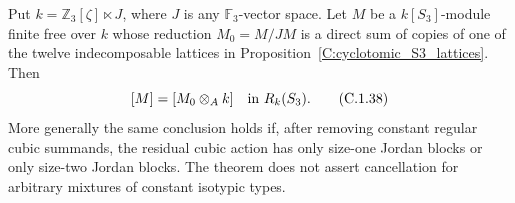 \begin{theorem}
\label{C:S3_isotypic_shallow_cancellation}
Put $k=\mathbb Z_3[\zeta]\ltimes J$, where $J$ is any
$\mathbb F_3$-vector space. Let $M$ be a $k[S_3]$-module finite free over $k$ whose reduction $M_0=M/JM$ is a direct sum
of copies of one of the twelve indecomposable lattices in
Proposition~\ref{C:cyclotomic_S3_lattices}. Then
\[
                         [M]=[M_0\otimes_Ak]
                                  \quad\hbox{in }R_k(S_3).      \tag{C.1.38}
\]
More generally the same conclusion holds if, after removing
constant regular cubic summands, the residual cubic action
has only size-one Jordan blocks or only size-two Jordan
blocks. The theorem does not assert cancellation for arbitrary
mixtures of constant isotypic types.
\end{theorem}
